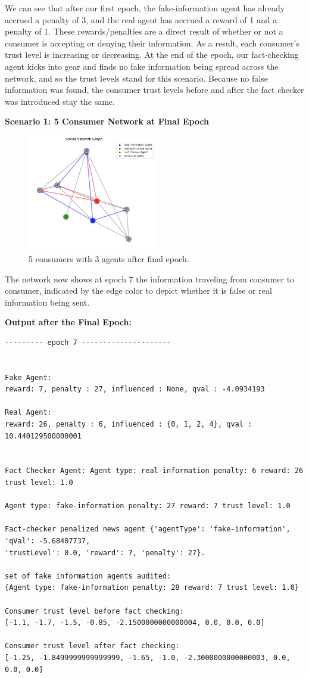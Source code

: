 \documentclass[twoside]{article}
\begin{document}
We can see that after our first epoch, the fake-information agent has already accrued a penalty of 3, and the real agent has accrued a reward of 1 and a penalty of 1. These rewards/penalties are a direct result of whether or not a consumer is accepting or denying their information. As a result, each consumer's trust level is increasing or decreasing. At the end of the epoch, our fact-checking agent kicks into gear and finds no fake information being spread across the network, and so the trust levels stand for this scenario. Because no false information was found, the consumer trust levels before and after the fact checker was introduced stay the same.

\textbf{Scenario 1: 5 Consumer Network at Final Epoch}

\begin{figure}[htbp]
     \centering
     \includegraphics[width=0.5\textwidth]{../results/images/output1.png}
     \caption{5 consumers with 3 agents after final epoch.}
     \label{fig: 5 consumer, 3 agents}
 \end{figure}
 
The network now shows at epoch 7 the information traveling from consumer to consumer, indicated by the edge color to depict whether it is false or real information being sent.

\textbf{Output after the Final Epoch:}
\begin{verbatim}
--------- epoch 7 ---------------------


Fake Agent: 
reward: 7, penalty : 27, influenced : None, qval : -4.0934193

Real Agent: 
reward: 26, penalty : 6, influenced : {0, 1, 2, 4}, qval : 10.440129500000001


Fact Checker Agent: Agent type: real-information penalty: 6 reward: 26 trust level: 1.0

Agent type: fake-information penalty: 27 reward: 7 trust level: 1.0

Fact-checker penalized news agent {'agentType': 'fake-information', 'qVal': -5.68407737, 
'trustLevel': 0.0, 'reward': 7, 'penalty': 27}.

set of fake information agents audited:  
{Agent type: fake-information penalty: 28 reward: 7 trust level: 1.0}

Consumer trust level before fact checking:  
[-1.1, -1.7, -1.5, -0.85, -2.1500000000000004, 0.0, 0.0, 0.0]

Consumer trust level after fact checking: 
[-1.25, -1.8499999999999999, -1.65, -1.0, -2.3000000000000003, 0.0, 0.0, 0.0]
\end{verbatim}
\end{document}
